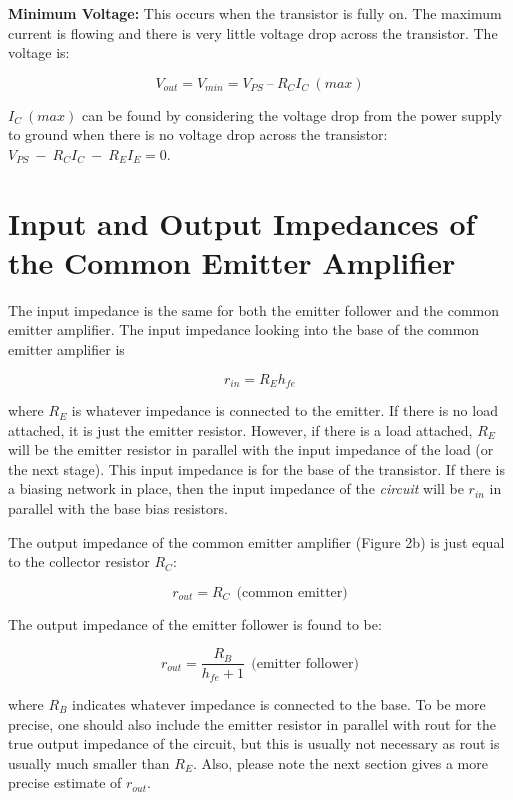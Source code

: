 \documentclass[10pt]{PhysLab1C} %
\begin{document}
\textbf{Minimum Voltage:} This occurs when the transistor is fully on. The maximum current is flowing and there is
very little voltage drop across the transistor. The voltage is:

$$V_{out} = V_{min} = V_{PS} ~– ~R_C I_C~ (max)$$

$I_C~(max)$ can be found by considering the voltage drop from the power supply to ground when there is no
voltage drop across the transistor: $V_{PS}~-~R_C I_C ~-~ R_E I_E = 0$.


\section{Input and Output Impedances of the Common Emitter Amplifier}

The input impedance is the same for both the emitter follower and the common emitter amplifier. The input
impedance looking into the base of the common emitter amplifier is

$$r_{in} = R_E h_{fe}$$

where $R_E$ is whatever impedance is connected to the emitter. If there is no load attached, it is just the emitter
resistor. However, if there is a load attached, $R_E$ will be the emitter resistor in parallel with the input
impedance of the load (or the next stage). This input impedance is for the base of the transistor. If there is a
biasing network in place, then the input impedance of the \textit{circuit} will be $r_{in}$ in parallel with the base bias resistors.

The output impedance of the common emitter amplifier (Figure 2b) is just equal to the collector resistor $R_C$:

$$r_{out} = R_C ~~\text{(common emitter)}$$

The output impedance of the emitter follower is found to be:

$$r_{out} = \frac{R_B}{h_{fe} +1}~~ \text{(emitter follower)}$$

where $R_B$ indicates whatever impedance is connected to the base. To be more precise, one should also include
the emitter resistor in parallel with rout for the true output impedance of the circuit, but this is usually not
necessary as rout is usually much smaller than $R_E$. Also, please note the next section gives a more precise
estimate of $r_{out}$.

\end{document}
